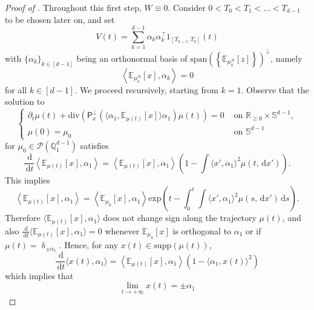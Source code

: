 \documentclass[a4paper,11pt]{article}
\theoremstyle{plain}
\newcommand{\supp}{\mathrm{supp}}
\newcommand{\proj}{\bm{\mathsf{P}}^\perp}
\newcommand{\diff}{\, \mathrm{d}}
\newcommand{\dive}{\mathrm{div}}
\renewcommand{\S}{\mathbb{S}^{d-1}}
\newcommand{\bW}{\bm{\mathit{W}}}
\newcommand{\bV}{\bm{\mathit{V}}}
\renewcommand{\geq}{\geqslant}
\numberwithin{equation}{section}
\begin{document}
\begin{proof}[Proof of ]
Throughout this first step, $\bW\equiv0$.
Consider $0<T_0<T_1<\ldots<T_{d-1}$ to be chosen later on, and set
\begin{equation*}
    \bV(t)=\sum_{k=1}^{d-1}\alpha_k\alpha_k^\top 1_{[T_{k-1},T_k]}(t)
\end{equation*}
with $\{\alpha_k\}_{k\in[d-1]}$ being an orthonormal basis of $\mathrm{span }\left(\left\{\mathbb{E}_{\mu_0^N}[z]\right\}\right)^\perp$, namely 
$$\left \langle \mathbb{E}_{\mu_0^N}[x],\alpha_k\right\rangle=0$$ 
for all $k\in[d-1]$. We proceed recursively, starting from $k=1$. Observe that the solution to
\begin{equation} \label{eq: cauchy.pb.reloaded}
\begin{cases}  \partial_t\mu(t)+\dive\left(\proj_x\left(\big\langle\alpha_1,\mathbb{E}_{\mu(t)}[x]\big\rangle \alpha_1\right)\mu(t)\right)=0 &\text{ on } \mathbb{R}_{\geq0}\times\S,\\ 
\mu(0)=\mu_0 &\text{ on } \S
\end{cases}
\end{equation}
for $\mu_0\in\mathscr{P}(\mathbb{Q}_1^{d-1})$ satisfies
\begin{equation*}
    \frac{\diff}{\diff t}\left\langle\mathbb{E}_{\mu(t)}[x],\alpha_1\right\rangle =\left\langle\mathbb{E}_{\mu(t)}[x],\alpha_1 \right\rangle \left(1-\int\langle x',\alpha_1\rangle^2\mu(t, \diff x')\right).
\end{equation*}
This implies
\begin{equation*}
    \left\langle\mathbb{E}_{\mu(t)}[x],\alpha_1\right\rangle=\left\langle\mathbb{E}_{\mu_0}[x],\alpha_1\right\rangle\mathrm{exp}\left(t-\int_0^t\int \langle x',\alpha_1\rangle^2 \mu(s, \diff x') \diff s\right).
\end{equation*} 
Therefore $\langle\mathbb{E}_{\mu(t)}[x],\alpha_1\rangle$ does not change sign along the trajectory $\mu(t)$, and also $\frac{\diff}{\diff t} \langle\mathbb{E}_{\mu(t)}[x],\alpha_1\rangle=0$ whenever $\mathbb{E}_{\mu_0}[x]$ is orthogonal to $\alpha_1$ or if $\mu(t)=\updelta_{\pm \alpha_1}$. Hence, for any $x(t)\in\supp(\mu(t))$,
\begin{equation*}
\frac{\diff}{\diff t} \langle x(t),\alpha_1\rangle =\left\langle \mathbb{E}_{\mu(t)}[x],\alpha_1 \right\rangle\left(1-\langle \alpha_1,x(t)\rangle^2\right)
\end{equation*}
which implies that 
\begin{equation*} %
    \lim_{t\to+\infty}x(t)=\pm \alpha_1
\end{equation*}%

\end{proof}
\end{document}

